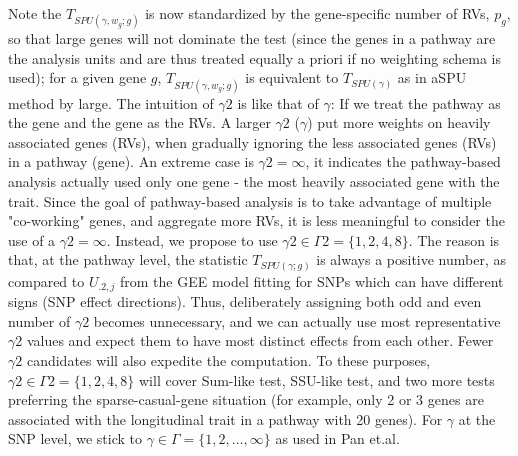\documentclass[12pt]{article}
\begin{document}
Note the $T_ { SPU(\gamma, w_g ; g) }$ is now standardized by the gene-specific number of RVs, $p_g$, so that large genes will not dominate the test (since the genes in a pathway are the analysis units and are thus treated equally a priori if no weighting schema is used); for a given gene $g$, $T_ { SPU(\gamma, w_g ; g) }$ is equivalent to $T_ { SPU(\gamma ) }$ as in aSPU method by large. The intuition of $\gamma 2$ is like that of $\gamma$: If we treat the pathway as the gene and the gene as the RVs. A larger $\gamma 2$ ($\gamma$) put more weights on heavily associated genes (RVs), when gradually ignoring the less associated genes (RVs) in a pathway (gene). An extreme case is $\gamma 2 = \infty$, it indicates the pathway-based analysis actually used only one gene - the most heavily associated gene with the trait. Since the goal of pathway-based analysis is to take advantage of multiple "co-working" genes, and aggregate more RVs, it is less meaningful to consider the use of a $\gamma 2= \infty$. Instead, we propose to use $\gamma 2 \in \Gamma 2 = \{1,2,4,8\}$. The reason is that, at the pathway level, the statistic $T_ { SPU(\gamma ; g) }$ is always a positive number, as compared to $U_{.2,j}$ from the GEE model fitting for SNPs which can have different signs (SNP effect directions). Thus, deliberately assigning both odd and even number of $\gamma 2$ becomes unnecessary, and we can actually use most representative $\gamma 2$ values and expect them to have most distinct effects from each other. Fewer $\gamma 2$ candidates will also expedite the computation. To these purposes, $\gamma 2 \in \Gamma 2 = \{1,2,4,8\}$ will cover Sum-like test, SSU-like test, and two more tests preferring the sparse-casual-gene situation (for example, only 2 or 3 genes are associated with the longitudinal trait in a pathway with 20 genes). For $\gamma$ at the SNP level, we stick to $\gamma \in \Gamma = \{1,2,\ldots,\infty\}$ as used in Pan et.al.\cite{pan2014powerful}
\end{document}
